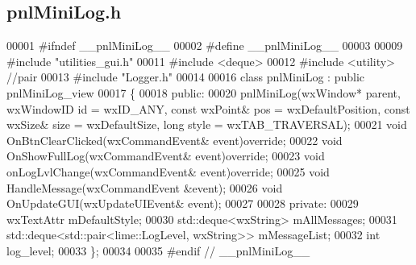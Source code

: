 \subsection{pnl\+Mini\+Log.\+h}
\label{pnlMiniLog_8h_source}

\begin{DoxyCode}
00001 \textcolor{preprocessor}{#ifndef \_\_pnlMiniLog\_\_}
00002 \textcolor{preprocessor}{#define \_\_pnlMiniLog\_\_}
00003 
00009 \textcolor{preprocessor}{#include "utilities_gui.h"}
00011 \textcolor{preprocessor}{#include <deque>}
00012 \textcolor{preprocessor}{#include <utility>} \textcolor{comment}{//pair}
00013 \textcolor{preprocessor}{#include "Logger.h"}
00014 
00016 \textcolor{keyword}{class }pnlMiniLog : \textcolor{keyword}{public} pnlMiniLog_view
00017 \{
00018 \textcolor{keyword}{public}:
00020     pnlMiniLog(wxWindow* parent, wxWindowID \textcolor{keywordtype}{id} = wxID\_ANY, \textcolor{keyword}{const} wxPoint& pos = wxDefaultPosition, \textcolor{keyword}{const} 
      wxSize& size = wxDefaultSize, \textcolor{keywordtype}{long} style = wxTAB\_TRAVERSAL);
00021     \textcolor{keywordtype}{void} OnBtnClearClicked(wxCommandEvent& event)\textcolor{keyword}{override};
00022     \textcolor{keywordtype}{void} OnShowFullLog(wxCommandEvent& event)\textcolor{keyword}{override};
00023     \textcolor{keywordtype}{void} onLogLvlChange(wxCommandEvent& event)\textcolor{keyword}{override};
00025     \textcolor{keywordtype}{void} HandleMessage(wxCommandEvent &event);
00026     \textcolor{keywordtype}{void} OnUpdateGUI(wxUpdateUIEvent& event);
00027 
00028 \textcolor{keyword}{private}:
00029     wxTextAttr mDefaultStyle;
00030     std::deque<wxString> mAllMessages;
00031     std::deque<std::pair<lime::LogLevel, wxString>> mMessageList;
00032     \textcolor{keywordtype}{int} log_level;
00033 \};
00034 
00035 \textcolor{preprocessor}{#endif // \_\_pnlMiniLog\_\_}
\end{DoxyCode}
